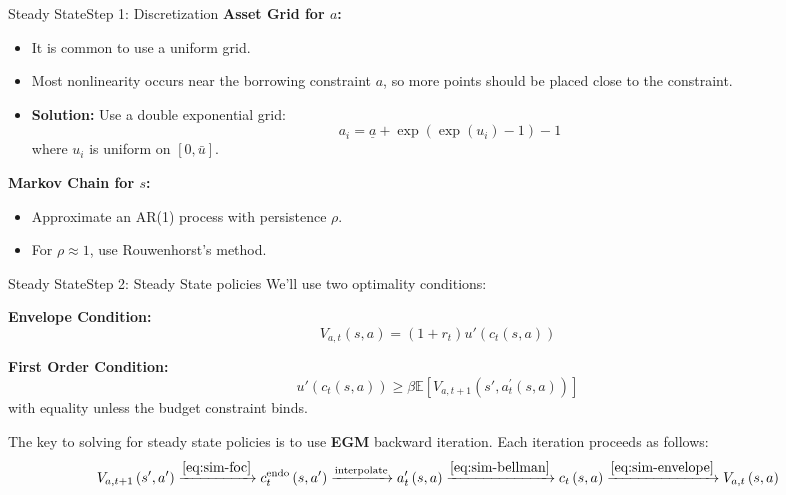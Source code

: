\documentclass[aspectratio=169]{beamer}
\begin{document}
\begin{frame}{Steady State}{Step 1: Discretization}
    \textbf{Asset Grid for $a$:}
    \begin{itemize}
        \item It is common to use a uniform grid.
        \item Most nonlinearity occurs near the borrowing constraint $a$, so more points should be placed close to the constraint.
        \item \textbf{Solution:} Use a double exponential grid:
        \[
            a_i = \underline{a} + \exp\left(\exp(u_i) - 1\right) - 1
        \]
        where $u_i$ is uniform on $[0, \bar{u}]$.
    \end{itemize}
    \textbf{Markov Chain for $s$:}
    \begin{itemize}
        \item Approximate an AR(1) process with persistence $\rho$.
        \item For $\rho \approx 1$, use Rouwenhorst’s method.
    \end{itemize}
\end{frame}

\begin{frame}{Steady State}{Step 2: Steady State policies}
    We'll use two optimality conditions: 

    \textbf{Envelope Condition:}
    \begin{equation}
        V_{a,t}\left(s,a\right) = \left( 1 + r_{t} \right) u'\left(c_{t}\left(s,a\right)\right)\label{eq:sim-envelope}
    \end{equation}

    \textbf{First Order Condition:}
    \begin{equation}
        u'\left( c_{t}\left( s, a \right) \right) \geq \beta \mathbb{E}\left[ V_{a,t+1}\left( s', a_{t}^{\prime}\left( s, a \right) \right) \right]\label{eq:sim-foc}
    \end{equation}
    with equality unless the budget constraint binds.

\vspace{0.5em}
    The key to solving for steady state policies is to use \textbf{EGM} backward iteration. Each iteration proceeds as follows:
    \[
        V_{a,t+1}\left( s', a' \right)
        \xrightarrow{\eqref{eq:sim-foc}} 
        c_{t}^{\text{endo}}\left( s, a' \right)
        \xrightarrow{\text{interpolate}} 
        a_{t}'\left( s, a \right)
        \xrightarrow{\eqref{eq:sim-bellman}} 
        c_{t}\left( s, a \right)
        \xrightarrow{\eqref{eq:sim-envelope}} 
        V_{a,t}\left( s, a \right)
    \]
\end{frame}
\end{document}
